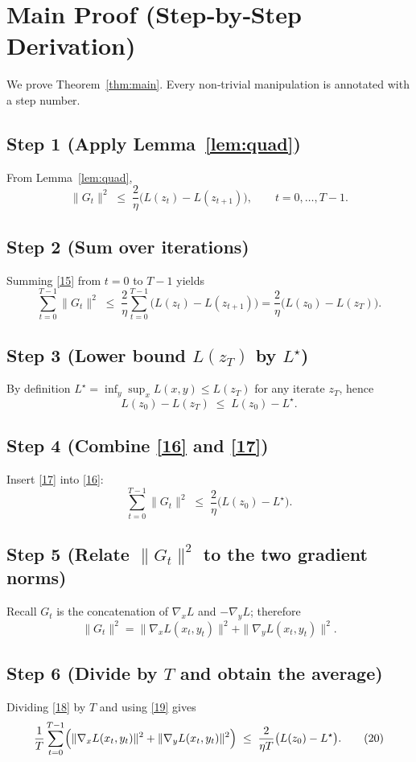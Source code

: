 \documentclass[11pt]{article}
\begin{document}
\section{Main Proof (Step‑by‑Step Derivation)}
We prove Theorem~\ref{thm:main}. Every non‑trivial manipulation is annotated with a step number.

\subsection*{Step 1 (Apply Lemma~\ref{lem:quad})}
From Lemma~\ref{lem:quad},
\[
\|G_t\|^{2}\;\le\;\frac{2}{\eta}\bigl(L(z_t)-L(z_{t+1})\bigr),\qquad t=0,\dots,T-1.
\tag{15}
\]

\subsection*{Step 2 (Sum over iterations)}
Summing \eqref{15} from $t=0$ to $T-1$ yields
\[
\sum_{t=0}^{T-1}\|G_t\|^{2}
\;\le\;\frac{2}{\eta}\sum_{t=0}^{T-1}\bigl(L(z_t)-L(z_{t+1})\bigr)
      =\frac{2}{\eta}\bigl(L(z_0)-L(z_T)\bigr).
\tag{16}
\]

\subsection*{Step 3 (Lower bound $L(z_T)$ by $L^{\star}$)}
By definition $L^{\star}= \inf_{y}\sup_{x}L(x,y)\le L(z_T)$ for any iterate $z_T$, hence
\[
L(z_0)-L(z_T)\;\le\;L(z_0)-L^{\star}.
\tag{17}
\]

\subsection*{Step 4 (Combine \eqref{16} and \eqref{17})}
Insert \eqref{17} into \eqref{16}:
\[
\sum_{t=0}^{T-1}\|G_t\|^{2}
\;\le\;\frac{2}{\eta}\bigl(L(z_0)-L^{\star}\bigr).
\tag{18}
\]

\subsection*{Step 5 (Relate $\|G_t\|^{2}$ to the two gradient norms)}
Recall $G_t$ is the concatenation of $\nabla_x L$ and $-\nabla_y L$; therefore
\[
\|G_t\|^{2}= \|\nabla_x L(x_t,y_t)\|^{2}+ \|\nabla_y L(x_t,y_t)\|^{2}.
\tag{19}
\]

\subsection*{Step 6 (Divide by $T$ and obtain the average)} 
Dividing \eqref{18} by $T$ and using \eqref{19} gives
\[
\frac{1}{T}\sum_{t=0}^{T-1}\Bigl(\|\nabla_x L(x_t,y_t)\|^{2}
      +\|\nabla_y L(x_t,y_t)\|^{2}\Bigr)
\;\le\;\frac{2}{\eta T}\bigl(L(z_0)-L^{\star}\bigr).
\tag{20}
\]
\end{document}
